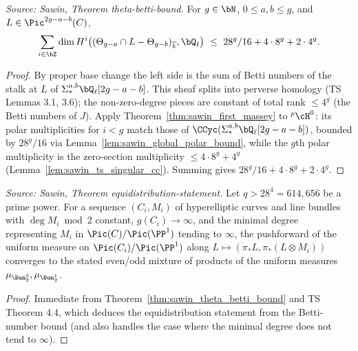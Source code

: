 \begin{theorem}
  \label{thm:sawin_theta_betti_bound}
  \textit{Source: Sawin, Theorem theta-betti-bound.}
  For $g\in\bN$, $0\le a,b\le g$, and $L\in\Pic^{2g-a-b}(C)$,
  \[ \sum_{i\in\bZ}\dim H^i\bigl((\Theta_{g-a}\cap L-\Theta_{g-b})_{\overline k},\bQ_\ell\bigr)
     \ \le\ 28^g/16 + 4\cdot 8^g + 2\cdot 4^g. \]
\end{theorem}
\begin{proof}
  By proper base change the left side is the sum of Betti numbers of the stalk at
  $L$ of $\Sigma^{a,b}_*\bQ_\ell[2g-a-b]$.  This sheaf splits into perverse
  homology (TS Lemmas 3.1, 3.6); the non-zero-degree pieces are constant of total
  rank $\le 4^g$ (the Betti numbers of $J$).  Apply
  Theorem~\ref{thm:sawin_first_massey} to ${}^p\cH^0$: its polar multiplicities for
  $i<g$ match those of $\CCyc(\Sigma^{a,b}_*\bQ_\ell[2g-a-b])$, bounded by
  $28^g/16$ via Lemma~\ref{lem:sawin_global_polar_bound}, while the $g$th polar
  multiplicity is the zero-section multiplicity $\le 4\cdot 8^g + 4^g$
  (Lemma~\ref{lem:sawin_ts_singular_cc}).  Summing gives
  $28^g/16 + 4\cdot 8^g + 2\cdot 4^g$.
\end{proof}

\begin{theorem}
  \label{thm:sawin_equidistribution}
  \textit{Source: Sawin, Theorem equidistribution-statement.}
  Let $q>28^4=614{,}656$ be a prime power.  For a sequence $(C_i,M_i)$ of
  hyperelliptic curves and line bundles with $\deg M_i\bmod 2$ constant,
  $g(C_i)\to\infty$, and the minimal degree representing $M_i$ in
  $\Pic(C)/\Pic(\PP^1)$ tending to $\infty$, the pushforward of the uniform
  measure on $\Pic(C_i)/\Pic(\PP^1)$ along $L\mapsto(\pi_*L,\pi_*(L\otimes M_i))$
  converges to the stated even/odd mixture of products of the uniform measures
  $\mu_{\Bun_2^0},\mu_{\Bun_2^1}$.
\end{theorem}
\begin{proof}
  Immediate from Theorem~\ref{thm:sawin_theta_betti_bound} and TS Theorem 4.4,
  which deduces the equidistribution statement from the Betti-number bound (and
  also handles the case where the minimal degree does not tend to $\infty$).
\end{proof}

